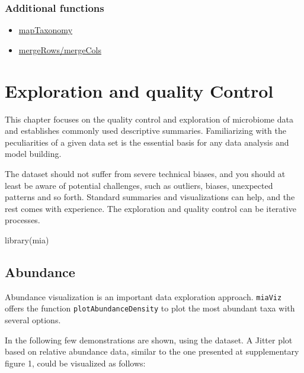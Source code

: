 \documentclass[
]{book}
\newenvironment{Shaded}{\begin{snugshade}}{\end{snugshade}}
\newcommand{\FunctionTok}[1]{\textcolor[rgb]{0.00,0.00,0.00}{#1}}
\newcommand{\NormalTok}[1]{#1}
\providecommand{\tightlist}{%
  \setlength{\itemsep}{0pt}\setlength{\parskip}{0pt}}
\begin{document}
\hypertarget{additional-functions}{%
\subsection{Additional functions}\label{additional-functions}}

\begin{itemize}
\tightlist
\item
  \href{https://microbiome.github.io/mia/reference/taxonomy-methods.html}{mapTaxonomy}
\item
  \href{https://microbiome.github.io/mia/reference/merge-methods.html}{mergeRows/mergeCols}
\end{itemize}

\hypertarget{quality-control}{%
\chapter{Exploration and quality Control}\label{quality-control}}

This chapter focuses on the quality control and exploration of
microbiome data and establishes commonly used descriptive
summaries. Familiarizing with the peculiarities of a given data set is
the essential basis for any data analysis and model building.

The dataset should not suffer from severe technical biases, and you
should at least be aware of potential challenges, such as outliers,
biases, unexpected patterns and so forth. Standard summaries and
visualizations can help, and the rest comes with experience. The
exploration and quality control can be iterative processes.

\begin{Shaded}
\begin{Highlighting}[]
\FunctionTok{library}\NormalTok{(mia)}
\end{Highlighting}
\end{Shaded}

\hypertarget{abundance}{%
\section{Abundance}\label{abundance}}

Abundance visualization is an important data exploration
approach. \texttt{miaViz} offers the function \texttt{plotAbundanceDensity} to plot
the most abundant taxa with several options.

In the following few demonstrations are shown, using the \citep{Lahti2014}
dataset. A Jitter plot based on relative abundance data, similar to
the one presented at \citep{Salosensaari2021} supplementary figure 1, could
be visualized as follows:
\end{document}
